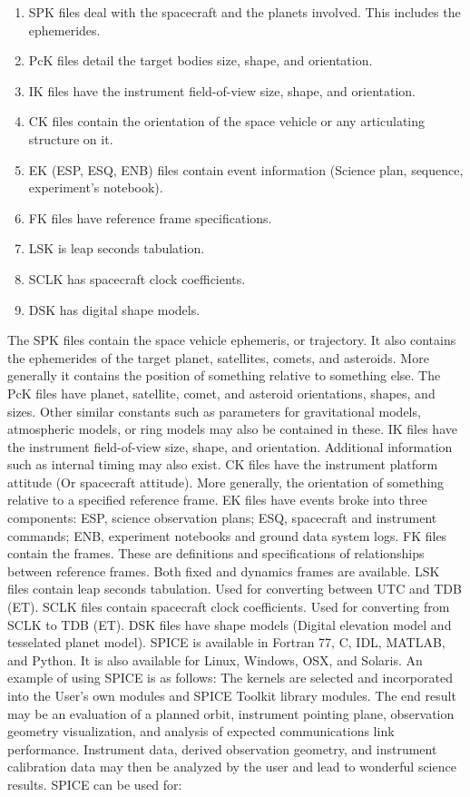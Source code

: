 \documentclass[crop=false,class=book]{standalone}
\begin{document}
            \begin{enumerate}
                \item SPK files deal with the spacecraft and the planets involved. This includes the ephemerides.
                \item PcK files detail the target bodies size, shape, and orientation.
                \item IK files have the instrument field-of-view size, shape, and orientation.
                \item CK files contain the orientation of the space vehicle or any articulating structure on it.
                \item EK (ESP, ESQ, ENB) files contain event information (Science plan, sequence, experiment's notebook).
                \item FK files have reference frame specifications.
                \item LSK is leap seconds tabulation.
                \item SCLK has spacecraft clock coefficients.
                \item DSK has digital shape models.
            \end{enumerate}
            The SPK files contain the space vehicle ephemeris, or trajectory. It also contains the ephemerides of the target planet, satellites, comets, and asteroids. More generally it contains the position of something relative to something else. The PcK files have planet, satellite, comet, and asteroid orientations, shapes, and sizes. Other similar constants such as parameters for gravitational models, atmospheric models, or ring models may also be contained in these. IK files have the instrument field-of-view size, shape, and orientation. Additional information such as internal timing may also exist. CK files have the instrument platform attitude (Or spacecraft attitude). More generally, the orientation of something relative to a specified reference frame. EK files have events broke into three components: ESP, science observation plans; ESQ, spacecraft and instrument commands; ENB, experiment notebooks and ground data system logs. FK files contain the frames. These are definitions and specifications of relationships between reference frames. Both fixed and dynamics frames are available. LSK files contain leap seconds tabulation. Used for converting between UTC and TDB (ET). SCLK files contain spacecraft clock coefficients. Used for converting from SCLK to TDB (ET). DSK files have shape models (Digital elevation model and tesselated planet model). SPICE is available in Fortran 77, C, IDL, MATLAB, and Python. It is also available for Linux, Windows, OSX, and Solaris. An example of using SPICE is as follows: The kernels are selected and incorporated into the User's own modules and SPICE Toolkit library modules. The end result may be an evaluation of a planned orbit, instrument pointing plane, observation geometry visualization, and analysis of expected communications link performance. Instrument data, derived observation geometry, and instrument calibration data may then be analyzed by the user and lead to wonderful science results. SPICE can be used for:
\end{document}
